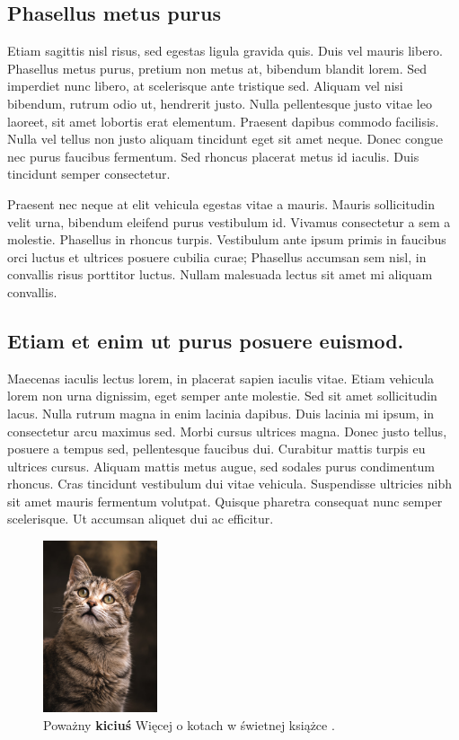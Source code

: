 \documentclass[a4paper, 12pt]{article}
\begin{document}
\subsection{Phasellus metus purus}
Etiam sagittis nisl risus, sed egestas ligula gravida quis. Duis vel mauris libero. Phasellus metus purus, pretium non metus at, bibendum blandit lorem. Sed imperdiet nunc libero, at scelerisque ante tristique sed. Aliquam vel nisi bibendum, rutrum odio ut, hendrerit justo. Nulla pellentesque justo vitae leo laoreet, sit amet lobortis erat elementum. Praesent dapibus commodo facilisis. Nulla vel tellus non justo aliquam tincidunt eget sit amet neque. Donec congue nec purus faucibus fermentum. Sed rhoncus placerat metus id iaculis. Duis tincidunt semper consectetur.

Praesent nec neque at elit vehicula egestas vitae a mauris. \cite{3} Mauris sollicitudin velit urna, bibendum eleifend purus vestibulum id. Vivamus consectetur a sem a molestie. Phasellus in rhoncus turpis. Vestibulum ante ipsum primis in faucibus orci luctus et ultrices posuere cubilia curae; Phasellus accumsan sem nisl, in convallis risus porttitor luctus. Nullam malesuada lectus sit amet mi aliquam convallis.

\subsection{Etiam et enim ut purus posuere euismod.}
Maecenas iaculis lectus lorem, in placerat sapien iaculis vitae. Etiam vehicula lorem non urna dignissim, eget semper ante molestie. Sed sit amet sollicitudin lacus. Nulla rutrum magna in enim lacinia dapibus. Duis lacinia mi ipsum, in consectetur arcu maximus sed. Morbi cursus ultrices magna. Donec justo tellus, posuere a tempus sed, pellentesque faucibus dui. Curabitur mattis turpis eu ultrices cursus. Aliquam mattis metus augue, sed sodales purus condimentum rhoncus. Cras tincidunt vestibulum dui vitae vehicula. Suspendisse ultricies nibh sit amet mauris fermentum volutpat. Quisque pharetra consequat nunc semper scelerisque. Ut accumsan aliquet dui ac efficitur.

\begin{figure}[htp]
\centering
\includegraphics[width=0.3\textwidth]{image1.png}
\caption{Poważny \textbf{kiciuś} Więcej o kotach w świetnej książce \cite{1}.}
\label{obraz1}
\end{figure}
\end{document}
